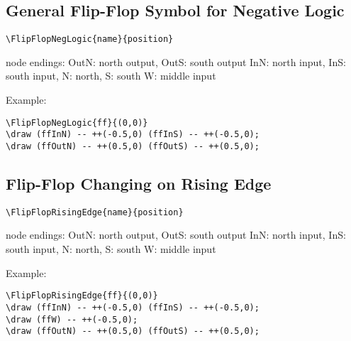 \documentclass[parskip=full]{scrartcl}
\begin{document}
\subsection{General Flip-Flop Symbol for Negative Logic}

\begin{verbatim}
\FlipFlopNegLogic{name}{position}
\end{verbatim}
node endings: OutN: north output, OutS: south output
              InN: north input, InS: south input,
              N: north, S: south
              W: middle input

Example:\\
\begin{minipage}{0.8\textwidth}
\begin{verbatim}
\FlipFlopNegLogic{ff}{(0,0)}
\draw (ffInN) -- ++(-0.5,0) (ffInS) -- ++(-0.5,0);
\draw (ffOutN) -- ++(0.5,0) (ffOutS) -- ++(0.5,0);
\end{verbatim}
\end{minipage}
\begin{minipage}{0.19\textwidth}
\end{minipage}

\subsection{Flip-Flop Changing on Rising Edge}

\begin{verbatim}
\FlipFlopRisingEdge{name}{position}
\end{verbatim}
node endings: OutN: north output, OutS: south output
              InN: north input, InS: south input,
              N: north, S: south
              W: middle input

Example:\\
\begin{minipage}{0.8\textwidth}
\begin{verbatim}
\FlipFlopRisingEdge{ff}{(0,0)}
\draw (ffInN) -- ++(-0.5,0) (ffInS) -- ++(-0.5,0);
\draw (ffW) -- ++(-0.5,0);
\draw (ffOutN) -- ++(0.5,0) (ffOutS) -- ++(0.5,0);
\end{verbatim}
\end{minipage}
\begin{minipage}{0.19\textwidth}
\end{minipage}
\end{document}
